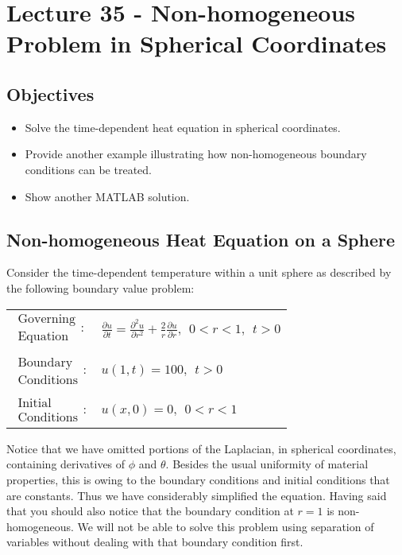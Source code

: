 \chapter{Lecture 35 - Non-homogeneous Problem in Spherical Coordinates}
\label{ch:lec35}
\section{Objectives}
\begin{itemize}
\item Solve the time-dependent heat equation in spherical coordinates.
\item Provide another example illustrating how non-homogeneous boundary conditions can be treated.
\item Show another MATLAB solution.
\end{itemize}
\setcounter{lstannotation}{0}

\section{Non-homogeneous Heat Equation on a Sphere}

Consider the time-dependent temperature within a unit sphere as described by the following boundary value problem:

\begin{table}[h]
\begin{tabular}{l l}
$\substack{\text{Governing} \\\text{Equation}}: $& $\frac{\partial u}{\partial t} = \frac{\partial^2 u}{\partial r^2} + \frac{2}{r}\frac{\partial u}{\partial r}, \ \ 0<r<1, \ \ t>0$ \\
& \\
$\substack{\text{Boundary} \\ \text{Conditions}}: $& $u(1,t)=100, \ \ t>0$\\
& \\
$\substack{\text{Initial} \\ \text{Conditions}}: $ & $u(x,0) = 0, \ \ 0<r<1 $ \\
\end{tabular}
\end{table} 

Notice that we have omitted portions of the Laplacian, in spherical coordinates, containing derivatives of $\phi$ and $\theta$.  Besides the usual uniformity of material properties, this is owing to the boundary conditions and initial conditions that are constants.  Thus we have considerably simplified the equation.  Having said that you should also notice that the boundary condition at $r=1$ is non-homogeneous.  We will not be able to solve this problem using separation of variables without dealing with that boundary condition first.

